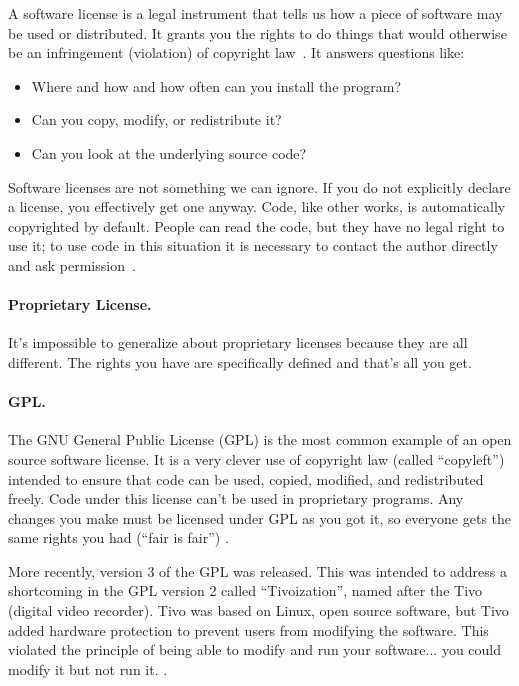 A software license is a legal instrument that tells us how a piece of software may be used or distributed. It grants you the rights to do things that would otherwise be an infringement (violation) of copyright law~\cite{techsoup:licenses}. It answers questions like:

\begin{itemize}
	\item Where and how and how often can you install the program?
	\item Can you copy, modify, or redistribute it?
	\item Can you look at the underlying source code?
\end{itemize}

Software licenses are not something we can ignore. If you do not explicitly declare a license, you effectively get one anyway. Code, like other works, is automatically copyrighted by default. People can read the code, but they have no legal right to use it; to use code in this situation it is necessary to contact the author directly and ask permission~\cite{atwood:lic}.

\paragraph{Proprietary License.} It's impossible to generalize about proprietary licenses because they are all different. The rights you have are specifically defined and that's all you get.

\paragraph{GPL.} The GNU General Public License (GPL) is the most common example of an open source software license. It is a very clever use of copyright law (called ``copyleft'') intended to ensure that code can be used, copied, modified, and redistributed freely. Code under this license can't be used in proprietary programs. Any changes you make must be licensed under GPL as you got it, so everyone gets the same rights you had (``fair is fair'') \cite{fosswire}.

More recently, version 3 of the GPL was released. This was intended to address a shortcoming in the GPL version 2 called ``Tivoization'', named after the Tivo (digital video recorder). Tivo was based on Linux, open source software, but Tivo added hardware protection to prevent users from modifying the software. This violated the principle of being able to modify and run your software... you could modify it but not run it. \cite{atwood:tivo}. 

